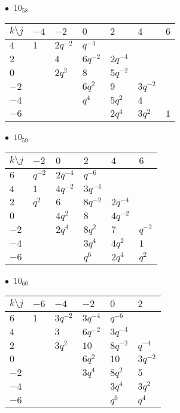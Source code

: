 %
\begin{minipage}{\linewidth}
$\bullet\ $ $10_{58}$ \vspace{0.5em} \\
\begin{tabular}{l|llllll}
$k \setminus j$ & $-4$ & $-2$ & $0$ & $2$ & $4$ & $6$ \\
\hline
$4$ & $1$ & $2q^{-2}$ & $q^{-4}$ &  &  &  \\
$2$ &  & $4$ & $6q^{-2}$ & $2q^{-4}$ &  &  \\
$0$ &  & $2q^{2}$ & $8$ & $5q^{-2}$ &  &  \\
$-2$ &  &  & $6q^{2}$ & $9$ & $3q^{-2}$ &  \\
$-4$ &  &  & $q^{4}$ & $5q^{2}$ & $4$ &  \\
$-6$ &  &  &  & $2q^{4}$ & $3q^{2}$ & $1$ \\
\end{tabular}
\vspace{2em}
\end{minipage}
%
\begin{minipage}{\linewidth}
$\bullet\ $ $10_{59}$ \vspace{0.5em} \\
\begin{tabular}{l|lllll}
$k \setminus j$ & $-2$ & $0$ & $2$ & $4$ & $6$ \\
\hline
$6$ & $q^{-2}$ & $2q^{-4}$ & $q^{-6}$ &  &  \\
$4$ & $1$ & $4q^{-2}$ & $3q^{-4}$ &  &  \\
$2$ & $q^{2}$ & $6$ & $8q^{-2}$ & $2q^{-4}$ &  \\
$0$ &  & $4q^{2}$ & $8$ & $4q^{-2}$ &  \\
$-2$ &  & $2q^{4}$ & $8q^{2}$ & $7$ & $q^{-2}$ \\
$-4$ &  &  & $3q^{4}$ & $4q^{2}$ & $1$ \\
$-6$ &  &  & $q^{6}$ & $2q^{4}$ & $q^{2}$ \\
\end{tabular}
\vspace{2em}
\end{minipage}
%
\begin{minipage}{\linewidth}
$\bullet\ $ $10_{60}$ \vspace{0.5em} \\
\begin{tabular}{l|lllll}
$k \setminus j$ & $-6$ & $-4$ & $-2$ & $0$ & $2$ \\
\hline
$6$ & $1$ & $3q^{-2}$ & $3q^{-4}$ & $q^{-6}$ &  \\
$4$ &  & $3$ & $6q^{-2}$ & $3q^{-4}$ &  \\
$2$ &  & $3q^{2}$ & $10$ & $8q^{-2}$ & $q^{-4}$ \\
$0$ &  &  & $6q^{2}$ & $10$ & $3q^{-2}$ \\
$-2$ &  &  & $3q^{4}$ & $8q^{2}$ & $5$ \\
$-4$ &  &  &  & $3q^{4}$ & $3q^{2}$ \\
$-6$ &  &  &  & $q^{6}$ & $q^{4}$ \\
\end{tabular}
\vspace{2em}
\end{minipage}

